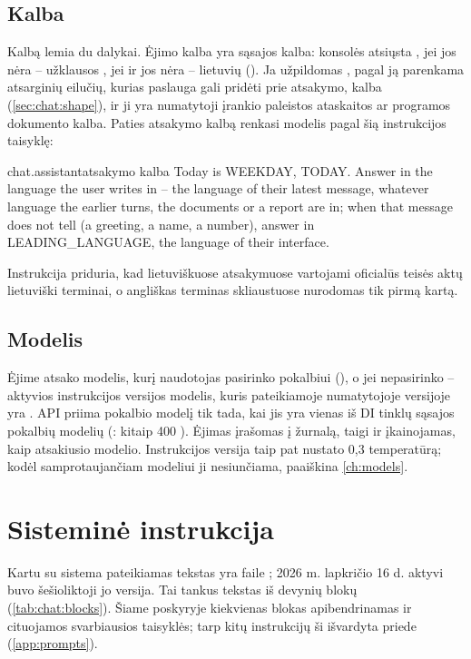 \subsection{Kalba}\label{sec:chat:language}

Kalbą lemia du dalykai. Ėjimo kalba yra sąsajos kalba: konsolės atsiųsta , jei jos
nėra -- užklausos , jei ir jos nėra -- lietuvių (). Ja
užpildomas , pagal ją parenkama atsarginių eilučių, kurias paslauga gali
pridėti prie atsakymo, kalba (\cref{sec:chat:shape}), ir ji yra numatytoji įrankio paleistos
ataskaitos ar programos dokumento kalba. Paties atsakymo kalbą renkasi modelis pagal šią
instrukcijos taisyklę:

\begin{promptexcerpt}{chat.assistant}{atsakymo kalba}
Today is {WEEKDAY}, {TODAY}. Answer in the language the user writes in – the language of their latest message, whatever language the earlier turns, the documents or a report are in; when that message does not tell (a greeting, a name, a number), answer in {LEADING_LANGUAGE}, the language of their interface.
\end{promptexcerpt}

Instrukcija priduria, kad lietuviškuose atsakymuose vartojami oficialūs teisės aktų lietuviški
terminai, o angliškas terminas skliaustuose nurodomas tik pirmą kartą.

\subsection{Modelis}

Ėjime atsako modelis, kurį naudotojas pasirinko pokalbiui (), o jei
nepasirinko -- aktyvios instrukcijos versijos modelis, kuris pateikiamoje numatytojoje versijoje
yra . API priima pokalbio modelį tik tada, kai jis yra vienas iš
DI tinklų sąsajos pokalbių modelių (: kitaip 400 ). Ėjimas
įrašomas į žurnalą, taigi ir įkainojamas, kaip atsakiusio modelio. Instrukcijos versija taip pat
nustato 0,3 temperatūrą; kodėl samprotaujančiam modeliui ji nesiunčiama, paaiškina
\cref{ch:models}.


\section{Sisteminė instrukcija}\label{sec:chat:prompt}

Kartu su sistema pateikiamas  tekstas yra faile
; 2026 m. lapkričio 16 d. aktyvi buvo šešioliktoji
jo versija. Tai tankus tekstas iš devynių blokų (\cref{tab:chat:blocks}). Šiame poskyryje
kiekvienas blokas apibendrinamas ir cituojamos svarbiausios taisyklės; tarp kitų instrukcijų ši
išvardyta priede (\cref{app:prompts}).

